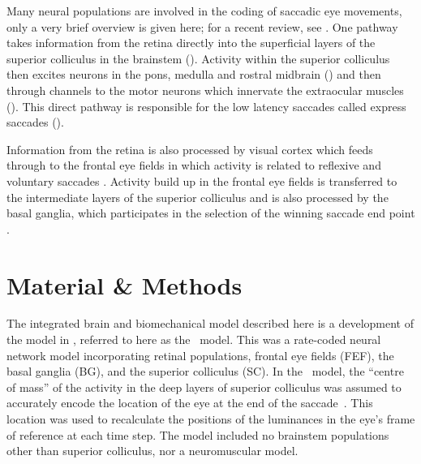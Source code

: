 \documentclass{frontiersSCNS}
\begin{document}


Many neural populations are involved in the coding of saccadic eye
movements, only a very brief overview is given here; for a recent
review, see . One pathway takes
information from the retina directly into the superficial layers of
the superior colliculus in the brainstem (). Activity within
the superior colliculus then excites neurons in the pons, medulla and
rostral midbrain () and then through
channels to the motor neurons which innervate the extraocular muscles
(). This direct pathway
is responsible for the low latency saccades called express saccades
().

Information from the retina is also processed by visual cortex which
feeds through to the frontal eye fields in which activity is related
to reflexive and voluntary
saccades . Activity build up in the frontal
eye fields is transferred to the intermediate layers of the superior
colliculus
 and is also processed by the basal ganglia, which
participates in the selection of the winning saccade end point
.





\section{Material \& Methods}

The integrated brain and biomechanical model described here is a
development of the model in ,
referred to here as the \ccg~model. This was a rate-coded neural
network model incorporating retinal populations, frontal eye fields
(FEF), the basal ganglia (BG), and the superior colliculus (SC). In
the \ccg~model, the ``centre of mass'' of the activity in the deep
layers of superior colliculus was assumed to accurately encode the
location of the eye at the end of the saccade~\cite{someone}. This
location was used to recalculate the positions of the luminances in
the eye's frame of reference at each time step. The model included no
brainstem populations other than superior colliculus, nor a
neuromuscular model.
\end{document}
